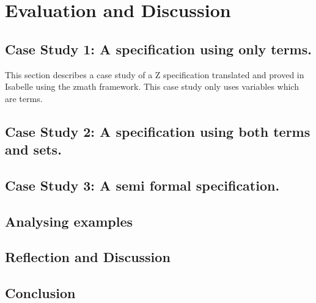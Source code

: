 \chapter{Evaluation and Discussion}
\label{ch:evaluation}



\section{Case Study 1: A specification using only terms.}

This section describes a case study of a Z specification translated and proved in Isabelle using the \gls{zmath} framework. This case study only uses variables which are terms.

\section{Case Study 2: A specification using both terms and sets.}

\section{Case Study 3: A semi formal specification.}

\section{Analysing examples}

\section{Reflection and Discussion}

\section{Conclusion}